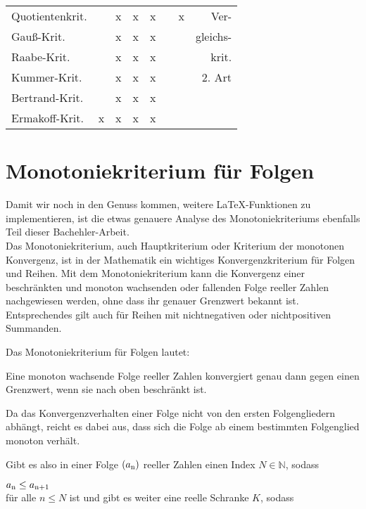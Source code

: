 \begin{table}
\begin{tabular}{lccccccr}
Quotientenkrit.   &         & x     & x    & x      &         & x         &  Ver-      \\
Gauß-Krit.        &         & x     & x    & x      &         &           & gleichs-  \\
Raabe-Krit.       &         & x     & x    & x      &         &           & krit. \\
Kummer-Krit.      &         & x     & x    & x      &         &           & 2. Art    \\
Bertrand-Krit.    &         & x     & x    & x      &         &           &           \\
Ermakoff-Krit.    & x       & x     & x    & x      &         &           &          
\end{tabular}
\end{table}
\newpage

\section{Monotoniekriterium für Folgen}
Damit wir noch in den Genuss kommen, weitere LaTeX-Funktionen zu implementieren, ist die etwas genauere Analyse des Monotoniekriteriums ebenfalls Teil dieser Bachehler-Arbeit.\\
Das Monotoniekriterium, auch Hauptkriterium oder Kriterium der monotonen Konvergenz, ist in der Mathematik ein wichtiges Konvergenzkriterium für Folgen und Reihen. Mit dem Monotoniekriterium kann die Konvergenz einer beschränkten und monoton wachsenden oder fallenden Folge reeller Zahlen nachgewiesen werden, ohne dass ihr genauer Grenzwert bekannt ist. Entsprechendes gilt auch für Reihen mit nichtnegativen oder nichtpositiven Summanden.

Das Monotoniekriterium für Folgen lautet:

    Eine monoton wachsende Folge reeller Zahlen konvergiert genau dann gegen einen Grenzwert, wenn sie nach oben beschränkt ist.

Da das Konvergenzverhalten einer Folge nicht von den ersten Folgengliedern abhängt, reicht es dabei aus, dass sich die Folge ab einem bestimmten Folgenglied monoton verhält. 

Gibt es also in einer Folge $( a\textsubscript{n} )$  reeller Zahlen einen Index $N \in \mathbb{N}$, sodass

$a \textsubscript{n} \leq a \textsubscript{n+1}$ \\

für alle $n \leq N$ ist und gibt es weiter eine reelle Schranke $K$, sodass\\

